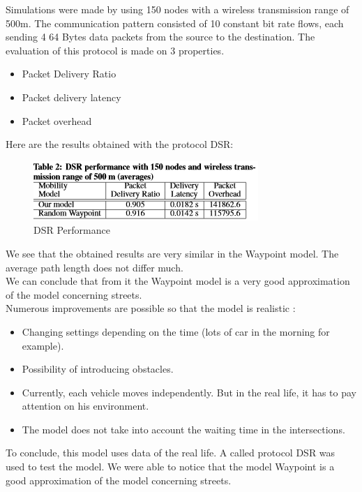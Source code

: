 Simulations were made by using 150 nodes with a wireless transmission range of 500m. The communication  pattern  consisted of 10 constant bit rate flows, each sending 4 64 Bytes data packets from the source to the destination.
The evaluation of this protocol is made on 3 properties.

\begin{itemize}
\item Packet Delivery Ratio
\item Packet delivery latency
\item Packet overhead
\end{itemize}

Here are the results obtained with the protocol DSR:\\

\begin{figure}[h]
\center
\includegraphics{../images/protocoleDSR.png}
\caption{\label{ProtDSR}DSR Performance}
\end{figure}

We see that the obtained results are very similar in the Waypoint model. The average path length does not differ much.\\
We can conclude that from it the Waypoint model is a very good approximation of the model concerning streets.\\
Numerous improvements are possible so that the model is realistic :

\begin{itemize}
\item Changing settings depending on the time (lots of car in the morning for example).
\item Possibility of introducing obstacles.
\item Currently, each vehicle moves independently. But in the real life, it has to pay attention on his environment.
\item The model does not take into account the waiting time in the intersections.
\end{itemize}

To conclude, this model uses data of the real life. A called protocol DSR was used to test the model. We were able to notice that the model Waypoint is a good approximation of the model concerning streets.

